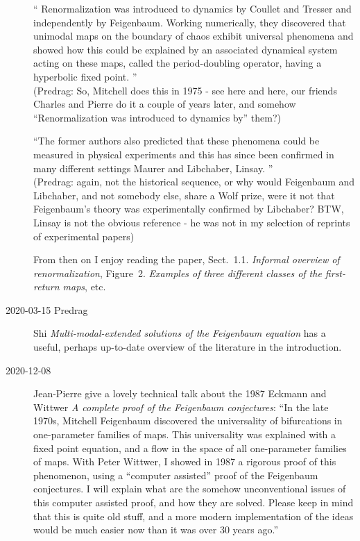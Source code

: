 \begin{description}
``
Renormalization was introduced to dynamics by Coullet and
Tresser and independently by Feigenbaum.
Working numerically, they discovered that unimodal maps on the boundary
of chaos exhibit universal phenomena and showed how this could be
explained by an associated dynamical system acting on these maps, called
the period-doubling operator, having a hyperbolic fixed point.
''
\\(Predrag: So, Mitchell does this in 1975 - see
 {here}
and  {here}, our
friends Charles and Pierre do it a couple of years later, and somehow
``Renormalization was introduced to dynamics by'' them?)

``The former authors also predicted that these phenomena could be
measured in physical experiments and this has since been confirmed in
many different settings Maurer and Libchaber, Linsay.
''
\\(Predrag: again, not the historical sequence, or why would Feigenbaum
and Libchaber, and not somebody else, share a Wolf prize, were it not
that Feigenbaum's theory was experimentally confirmed by Libchaber?
BTW, Linsay is not the obvious reference - he was not
in my selection of reprints of experimental papers)

From then on I enjoy reading the paper, Sect.~1.1. {\em Informal overview
of renormalization}, Figure~2. \emph{Examples of three different classes
of the first-return maps}, etc.

\item[2020-03-15 Predrag] Shi {\em Multi-modal-extended
solutions of the {Feigenbaum} equation} has a useful, perhaps up-to-date
overview of the literature in the introduction.

\newpage

\item[2020-12-08] Jean-Pierre give a lovely
 {technical talk} about
the 1987 Eckmann and Wittwer
{\em A complete proof of the {Feigenbaum} conjectures}:
``In the late 1970s, Mitchell Feigenbaum discovered the universality of
bifurcations in one-parameter families of maps. This universality was
explained with a fixed point equation, and a flow in the space of all
one-parameter families of maps. With Peter Wittwer, I showed in 1987 a
rigorous proof of this phenomenon, using a ``computer assisted'' proof of
the Feigenbaum conjectures. I will explain what are the somehow
unconventional issues of this computer assisted proof, and how they are
solved. Please keep in mind that this is quite old stuff, and a more
modern implementation of the ideas would be much easier now than it was
over 30 years ago.''


\end{description}

